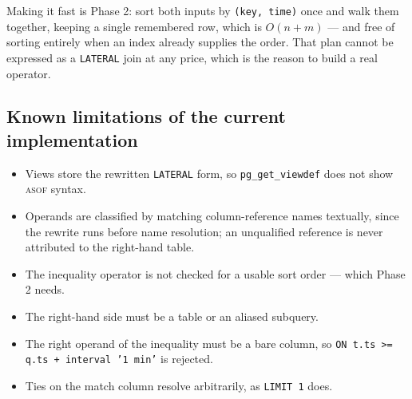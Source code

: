 \documentclass[11pt,a4paper]{article}
\newcommand{\code}[1]{\texttt{\small #1}}
\newcommand{\asof}{{\normalfont\scshape asof}}
\begin{document}
Making it fast is Phase 2: sort both inputs by \code{(key, time)} once and walk them
together, keeping a single remembered row, which is $O(n + m)$ — and free of sorting
entirely when an index already supplies the order. That plan cannot be expressed as a
\code{LATERAL} join at any price, which is the reason to build a real operator.

\subsection*{Known limitations of the current implementation}

\begin{itemize}[nosep,leftmargin=*]
\item Views store the rewritten \code{LATERAL} form, so \code{pg\_get\_viewdef} does not
      show \asof{} syntax.
\item Operands are classified by matching column-reference names textually, since the
      rewrite runs before name resolution; an unqualified reference is never attributed to
      the right-hand table.
\item The inequality operator is not checked for a usable sort order — which Phase 2 needs.
\item The right-hand side must be a table or an aliased subquery.
\item The right operand of the inequality must be a bare column, so
      \code{ON t.ts >= q.ts + interval '1 min'} is rejected.
\item Ties on the match column resolve arbitrarily, as \code{LIMIT 1} does.
\end{itemize}
\end{document}
